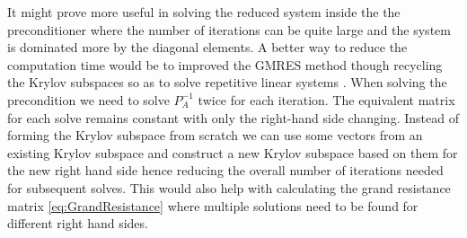  It might prove more useful in solving the reduced system inside the the preconditioner where the number of iterations can be quite large and the system is dominated more by the diagonal elements. A better way to reduce the computation time would be to improved the GMRES method though recycling the Krylov subspaces so as to solve repetitive linear systems \cite{Parks2006RecyclingSystems,Rostami2019FastBiofluids}. When solving the precondition we need to solve $P_A^{-1}$ twice for each iteration. The equivalent matrix for each solve remains constant with only the right-hand side changing. Instead of forming the Krylov subspace from scratch we can use some vectors from an existing Krylov subspace and construct a new Krylov subspace based on them for the new right hand side hence reducing the overall number of iterations needed for subsequent solves. This would also help with calculating the grand resistance matrix \cref{eq:GrandResistance} where multiple solutions need to be found for different right hand sides.